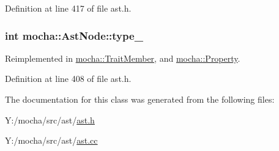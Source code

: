 Definition at line 417 of file ast.h.

\hypertarget{classmocha_1_1_ast_node_a59e9238b2db27f1e5ef1ccf81c93cd16}{
\subsubsection[{type\_\-}]{\setlength{\rightskip}{0pt plus 5cm}int {\bf mocha::AstNode::type\_\-}}}
\label{classmocha_1_1_ast_node_a59e9238b2db27f1e5ef1ccf81c93cd16}


Reimplemented in \hyperlink{classmocha_1_1_trait_member_a972c5f4718c2aa74ae626724521afd3c}{mocha::TraitMember}, and \hyperlink{classmocha_1_1_property_afdca8908f121ab969e2dd3d5a427da6b}{mocha::Property}.



Definition at line 408 of file ast.h.



The documentation for this class was generated from the following files:\begin{DoxyCompactItemize}
\item 
Y:/mocha/src/ast/\hyperlink{ast_8h}{ast.h}\item 
Y:/mocha/src/ast/\hyperlink{ast_8cc}{ast.cc}\end{DoxyCompactItemize}
